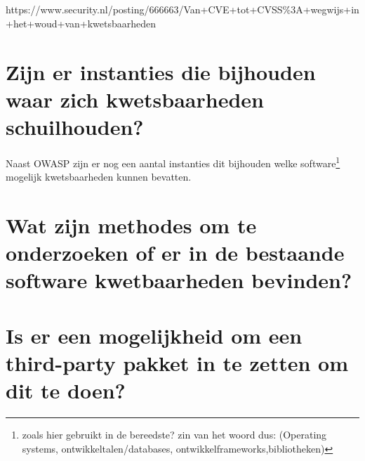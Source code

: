 \section{}

https://www.security.nl/posting/666663/Van+CVE+tot+CVSS\%3A+wegwijs+in+het+woud+van+kwetsbaarheden










\section{Zijn er instanties die bijhouden waar zich kwetsbaarheden schuilhouden?}

Naast OWASP zijn er nog een aantal instanties dit bijhouden welke software\footnote{zoals hier gebruikt in de bereedste? zin van het woord dus: (Operating systems, ontwikkeltalen/databases, ontwikkelframeworks,bibliotheken) }
mogelijk kwetsbaarheden kunnen bevatten.
\begin{itemize}

\end{itemize}


\section{Wat zijn methodes om te onderzoeken of er in de bestaande software kwetbaarheden bevinden?}

\section{Is er een mogelijkheid om een third-party pakket in te zetten om dit te doen?}
